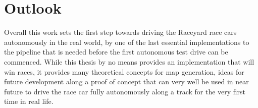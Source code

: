 \section{Outlook}
Overall this work sets the first step towards driving the Raceyard race cars autonomously in the real world, by one of the last essential implementations to the pipeline that is needed before the first autonomous test drive can be commenced. While this thesis by no means provides an implementation that will win races, it provides many theoretical concepts for map generation, ideas for future development along a proof of concept that can very well be used in near future to drive the race car fully autonomously along a track for the very first time in real life.